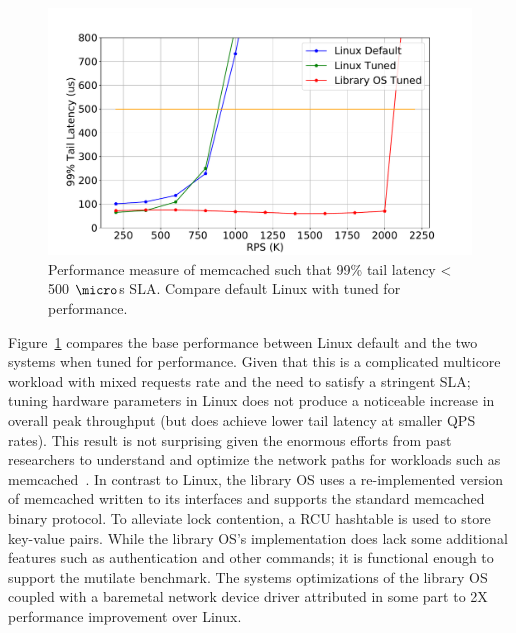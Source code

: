\begin{figure}
	\includegraphics[width=\columnwidth]{asplos2021_figures/mcd_sla.pdf}
	\caption{Performance measure of memcached such that 99\% tail latency < 500 $\micro$s SLA. Compare default Linux with tuned for performance.}
	\label{fig:mcd_sla_tot}
\end{figure}



Figure~\ref{fig:mcd_sla_tot} compares the base performance between Linux default and the two systems when tuned for performance. Given that this is a complicated multicore workload with mixed requests rate and the need to satisfy a stringent SLA; tuning hardware parameters in Linux does not produce a noticeable increase in overall peak throughput (but does achieve lower tail latency at smaller QPS rates). This result is not surprising given the enormous efforts from past researchers to understand and optimize the network paths for workloads such as memcached~\cite{tailatscale, scalingmcdfacebook, workloadanalysisfacebook, ix, ebbrt, farm, 222583}. In contrast to Linux, the library OS uses a re-implemented version of memcached written to its interfaces and supports the standard memcached binary protocol. To alleviate lock contention, a RCU hashtable is used to store key-value pairs. While the library OS's implementation does lack some additional features such as authentication and other commands; it is functional enough to support the mutilate benchmark. The systems optimizations of the library OS coupled with a baremetal network device driver attributed in some part to 2X performance improvement over Linux.



